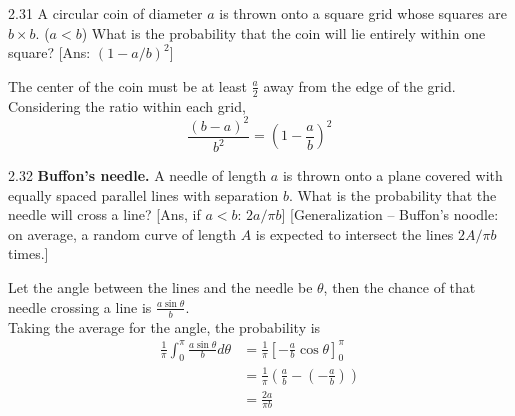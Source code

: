 \documentclass[12pt, a4paper]{article}
\begin{document}
\begin{prob}{2.31}
    A circular coin of diameter $a$ is thrown onto a square grid whose squares are $b \times b$. ($a < b$) What is the probability that the coin will lie entirely within one square? [Ans: $(1 - a/b)^2$]
\end{prob}
\begin{sol}
    The center of the coin must be at least $\frac{a}{2}$ away from the edge of the grid.
    Considering the ratio within each grid, $$\frac{(b-a)^2}{b^2} = (1-\frac{a}{b})^2$$ 
\end{sol}
\bigskip

\begin{prob}{2.32}
    \textbf{Buffon's needle.} A needle of length $a$ is thrown onto a plane covered with equally spaced parallel lines with separation $b$. What is the probability that the needle will cross a line? [Ans, if $a < b$: $2a/\pi b$] [Generalization -- Buffon's noodle: on average, a random curve of length $A$ is expected to intersect the lines $2A/\pi b$ times.]
\end{prob}
\begin{sol}
    Let the angle between the lines and the needle be $\theta$, then the chance of that needle crossing a line is $\frac{a \sin \theta}{b}$. \\ 
    Taking the average for the angle, the probability is 
    \begin{align*}
        \frac{1}{\pi} \int_{0}^{\pi} \frac{a \sin \theta}{b} d\theta &= \frac{1}{\pi}\left[-\frac{a}{b} \cos \theta \right]_0^\pi \\
        &= \frac{1}{\pi}\left(\frac{a}{b} - \left(- \frac{a}{b}\right)\right) \\
        &= \frac{2a}{\pi b}
    \end{align*}
\end{sol}
\bigskip
\end{document}
